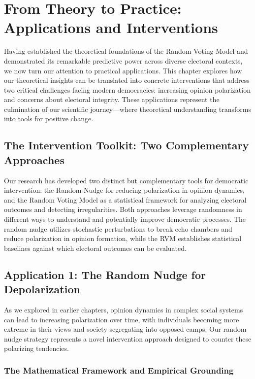 \chapter{From Theory to Practice: Applications and Interventions}
\label{chap6}

Having established the theoretical foundations of the Random Voting Model and demonstrated its remarkable predictive power across diverse electoral contexts, we now turn our attention to practical applications. This chapter explores how our theoretical insights can be translated into concrete interventions that address two critical challenges facing modern democracies: increasing opinion polarization and concerns about electoral integrity. These applications represent the culmination of our scientific journey—where theoretical understanding transforms into tools for positive change.

\section{The Intervention Toolkit: Two Complementary Approaches}

Our research has developed two distinct but complementary tools for democratic intervention: the Random Nudge for reducing polarization in opinion dynamics, and the Random Voting Model as a statistical framework for analyzing electoral outcomes and detecting irregularities. Both approaches leverage randomness in different ways to understand and potentially improve democratic processes. The random nudge utilizes stochastic perturbations to break echo chambers and reduce polarization in opinion formation, while the RVM establishes statistical baselines against which electoral outcomes can be evaluated.

\section{Application 1: The Random Nudge for Depolarization}

As we explored in earlier chapters, opinion dynamics in complex social systems can lead to increasing polarization over time, with individuals becoming more extreme in their views and society segregating into opposed camps. Our random nudge strategy represents a novel intervention approach designed to counter these polarizing tendencies.

\subsection{The Mathematical Framework and Empirical Grounding}

